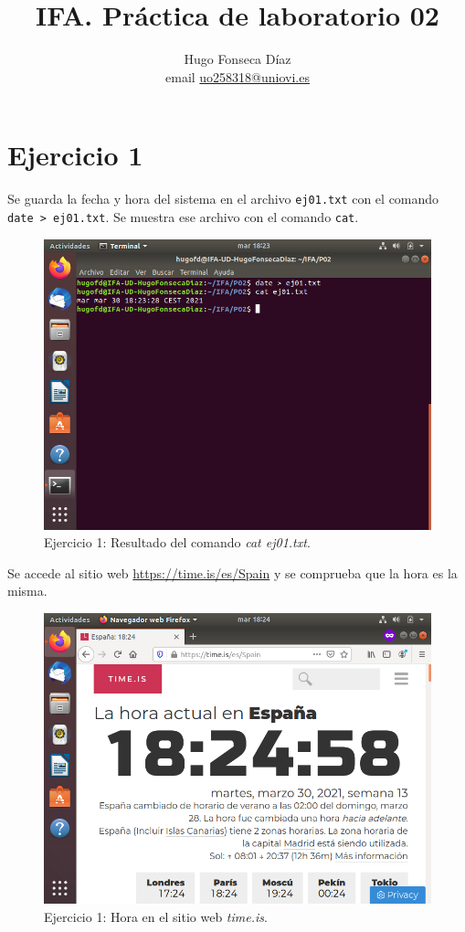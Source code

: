 \documentclass[11pt]{article}
\begin{document}
\title{IFA. Práctica de laboratorio 02}
\author{Hugo Fonseca Díaz \\ email \href{mailto:uo258318@uniovi.es}{uo258318@uniovi.es}}
\maketitle
\section{Ejercicio 1}
Se guarda la fecha y hora del sistema en el archivo \verb|ej01.txt| con el comando \verb|date > ej01.txt|. Se muestra ese archivo con el comando \verb|cat|.
\begin{figure}[h!]
  \caption{Ejercicio 1: Resultado del comando \textit{cat ej01.txt}.}
  \centering
  \includegraphics{e1-1.png}
\end{figure}

Se accede al sitio web \url{https://time.is/es/Spain} y se comprueba que la hora es la misma.
\begin{figure}[h!]
    \caption{Ejercicio 1: Hora en el sitio web \textit{time.is}.}
  \centering
  \includegraphics{e1-2.png}
\end{figure}
\end{document}
